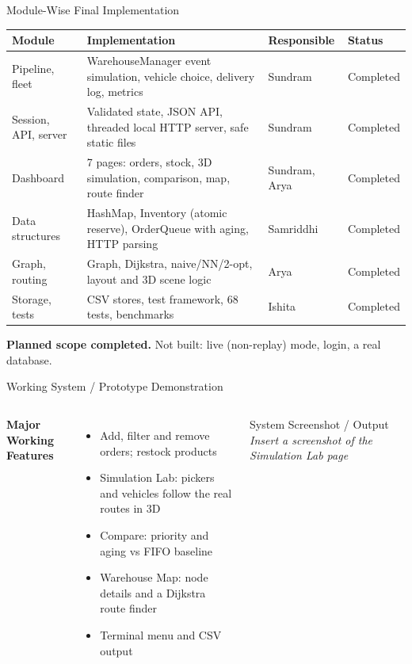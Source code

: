 \documentclass[aspectratio=169,11pt]{beamer}
\newcommand{\todo}[1]{\textit{\color{red}#1}}
\begin{document}
\begin{frame}{Module-Wise Final Implementation}
\scriptsize
\begin{center}
\renewcommand{\arraystretch}{1.05}
\begin{tabularx}{.96\textwidth}{@{}p{2.4cm}X p{2.0cm}p{1.7cm}@{}}
\toprule
\textbf{Module} & \textbf{Implementation} & \textbf{Responsible} & \textbf{Status}\\
\midrule
Pipeline, fleet &
WarehouseManager event simulation, vehicle choice, delivery log, metrics & Sundram & Completed\\
Session, API, server &
Validated state, JSON API, threaded local HTTP server, safe static files & Sundram & Completed\\
Dashboard &
7 pages: orders, stock, 3D simulation, comparison, map, route finder & Sundram, Arya & Completed\\
Data structures &
HashMap, Inventory (atomic reserve), OrderQueue with aging, HTTP parsing & Samriddhi & Completed\\
Graph, routing &
Graph, Dijkstra, naive/NN/2-opt, layout and 3D scene logic & Arya & Completed\\
Storage, tests &
CSV stores, test framework, 68 tests, benchmarks & Ishita & Completed\\
\bottomrule
\end{tabularx}
\end{center}
\vspace{2mm}
\begin{center}
\colorbox{GEULightBlue}{\parbox{.8\textwidth}{\centering
\textbf{Planned scope completed.} Not built: live (non-replay) mode, login, a real database.}}
\end{center}
\vfill
\end{frame}

\begin{frame}{Working System / Prototype Demonstration}
\footnotesize
\begin{columns}[T,totalwidth=\textwidth]
\textbf{\color{GEUBlue}Major Working Features}
\begin{itemize}\itemsep3pt
    \item Add, filter and remove orders; restock products
    \item Simulation Lab: pickers and vehicles follow the real routes in 3D
    \item Compare: priority and aging vs FIFO baseline
    \item Warehouse Map: node details and a Dijkstra route finder
    \item Terminal menu and CSV output
\end{itemize}
\begin{block}{System Screenshot / Output}
\centering\vspace{11mm}
\todo{Insert a screenshot of the Simulation Lab page}
\vspace{11mm}
\end{block}
\end{columns}
\vfill
\end{frame}
\end{document}
